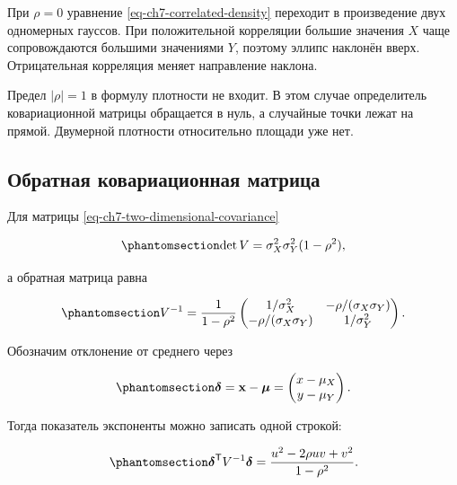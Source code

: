 \documentclass[
  russian,
  11pt,
  a4paper,
  open=any]{scrbook}
\begin{document}
При \(\rho=0\) уравнение \ref{eq-ch7-correlated-density} переходит в
произведение двух одномерных гауссов. При положительной корреляции
большие значения \(X\) чаще сопровождаются большими значениями \(Y\),
поэтому эллипс наклонён вверх. Отрицательная корреляция меняет
направление наклона.

Предел \(|\rho|=1\) в формулу плотности не входит. В этом случае
определитель ковариационной матрицы обращается в нуль, а случайные точки
лежат на прямой. Двумерной плотности относительно площади уже нет.

\subsection{Обратная ковариационная
матрица}\label{ux43eux431ux440ux430ux442ux43dux430ux44f-ux43aux43eux432ux430ux440ux438ux430ux446ux438ux43eux43dux43dux430ux44f-ux43cux430ux442ux440ux438ux446ux430}

Для матрицы \ref{eq-ch7-two-dimensional-covariance}

\begin{equation}\protect\phantomsection\label{eq-ch7-covariance-determinant}{
\det V=\sigma_X^2\sigma_Y^2(1-\rho^2),
}\end{equation}

а обратная матрица равна

\begin{equation}\protect\phantomsection\label{eq-ch7-inverse-covariance}{
V^{-1}=
\frac{1}{1-\rho^2}
\begin{pmatrix}
1/\sigma_X^2 & -\rho/(\sigma_X\sigma_Y)\\
-\rho/(\sigma_X\sigma_Y) & 1/\sigma_Y^2
\end{pmatrix}.
}\end{equation}

Обозначим отклонение от среднего через

\begin{equation}\protect\phantomsection\label{eq-ch7-residual-vector}{
\boldsymbol\delta=
\mathbf x-\boldsymbol\mu=
\begin{pmatrix}
x-\mu_X\\
y-\mu_Y
\end{pmatrix}.
}\end{equation}

Тогда показатель экспоненты можно записать одной строкой:

\begin{equation}\protect\phantomsection\label{eq-ch7-quadratic-form-rho}{
\boldsymbol\delta^{\mathsf T}V^{-1}\boldsymbol\delta
=\frac{u^2-2\rho uv+v^2}{1-\rho^2}.
}\end{equation}
\end{document}
